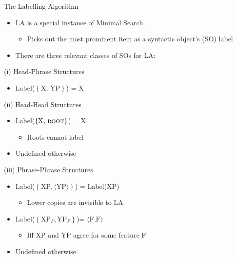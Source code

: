 \documentclass[Proposal]{subfiles}
\begin{document}
\begin{frame}
  {The Labelling Algorithm}
  \begin{itemize}
    \item LA is a special instance of Minimal Search.
      \pause
      \begin{itemize}
	\item Picks out the most prominent item as a syntactic object's (SO) label
      \end{itemize}
      \pause
    \item There are three relevant classes of SOs for LA:
  \end{itemize}
  \begin{overprint}
    \begin{block}
      {(i) Head-Phrase Structures}
      \begin{itemize}[<+->]
        \item Label($\left\{ \text{X, YP} \right\}$) = X
      \end{itemize}
    \end{block}
    \begin{block}
      {(ii) Head-Head Structures}
      \begin{itemize}[<+->]
        \item Label($\left\{ \text{X, }\textsc{root} \right\}$) = X
          \begin{itemize}
            \item Roots cannot label
          \end{itemize}
        \item Undefined otherwise
      \end{itemize}
    \end{block}
    \begin{block}
      {(iii) Phrase-Phrase Structures}
      \begin{itemize}[<+->]
        \item Label($\left\{ \text{XP}, \langle\text{YP}\rangle \right\}$) = Label(XP)
          \begin{itemize}
            \item Lower copies are invisible to LA.
          \end{itemize}
        \item Label($\left\{ \text{XP}_F, \text{YP}_F \right\}$)= $\langle\text{F,F}\rangle$
          \begin{itemize}
            \item Iff XP and YP agree for some feature F
          \end{itemize}
        \item Undefined otherwise
      \end{itemize}
    \end{block}
  \end{overprint}
\end{frame}
\end{document}
